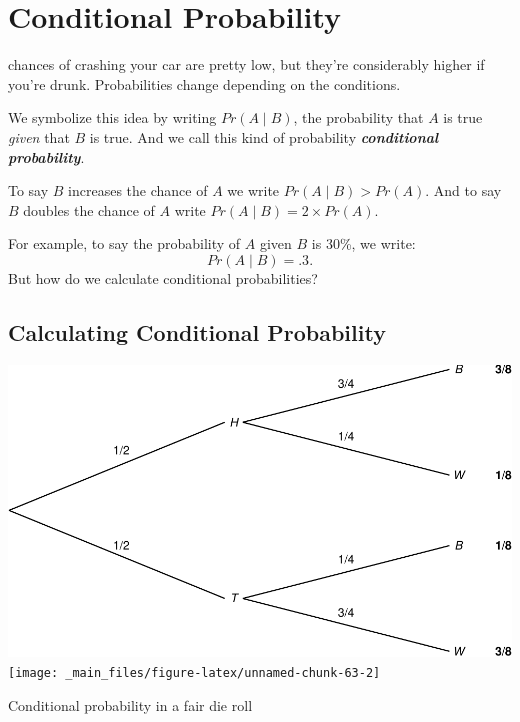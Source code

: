 \documentclass[justified]{tufte-book}
\newcommand{\given}{\mid}
\newcommand{\gt}{>}
\newcommand{\p}{Pr}
\theoremstyle{definition}
\theoremstyle{definition}
\theoremstyle{definition}
\theoremstyle{remark}
\begin{document}
\hypertarget{conditional-probability}{%
\chapter{Conditional Probability}\label{conditional-probability}}

 chances of crashing your car are pretty low, but
they're considerably higher if you're drunk. Probabilities change
depending on the conditions.

We symbolize this idea by writing \(\p(A \given B)\), the probability
that \(A\) is true \emph{given} that \(B\) is true. And we call this
kind of probability \textbf{\emph{conditional probability}}.

\begin{marginfigure}
To say \(B\) increases the chance of \(A\) we write
\(\p(A \given B) \gt \p(A)\). And to say \(B\) doubles the chance of
\(A\) write \(\p(A \given B) = 2 \times \p(A)\).
\end{marginfigure}

For example, to say the probability of \(A\) given \(B\) is 30\%, we
write: \[ \p(A \given B) = .3. \] But how do we calculate conditional
probabilities?

\hypertarget{calculating-conditional-probability}{%
\section{Calculating Conditional
Probability}\label{calculating-conditional-probability}}

\begin{marginfigure}
\includegraphics{_main_files/figure-latex/unnamed-chunk-63-1} \texttt{[image: \_main\_files/figure-latex/unnamed-chunk-63-2]} \caption[Conditional probability in a fair die roll]{Conditional probability in a fair die roll}\label{fig:unnamed-chunk-63}
\end{marginfigure}
\end{document}
